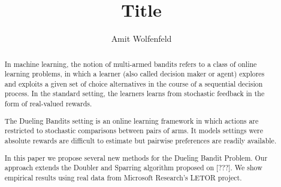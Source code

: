 \documentclass{llncs}
\author{Amit Wolfenfeld\inst{1}}
\institute{Technion}
\title{Title}
\begin{document}
\maketitle

\begin{abstract}
In machine learning, the notion of multi-armed bandits refers
to a class of online learning problems, in which a learner (also called decision maker or agent) explores and exploits a given set of choice alternatives in the course of a sequential decision process. 
In the standard setting, the learners learns from stochastic feedback in the form of real-valued rewards.

The Dueling Bandits setting is an online learning framework in which actions are restricted to stochastic comparisons between pairs of arms.
It models settings were absolute rewards are difficult to estimate but pairwise preferences are readily available. 

In this paper we propose several new methods for the Dueling Bandit Problem. Our approach extends the Doubler and Sparring algorithm proposed on [???]. We show empirical results using real data from Microsoft Research's LETOR project.
\end{abstract}
\end{document}
